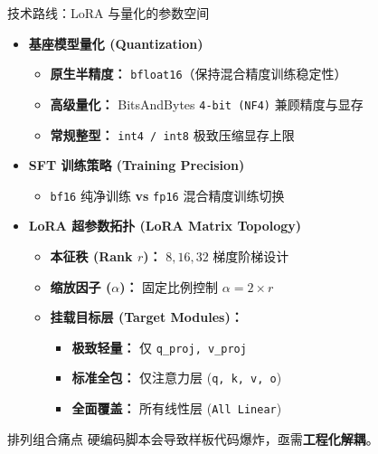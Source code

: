 \documentclass[aspectratio=169]{beamer}
\begin{document}
\begin{frame}{技术路线：LoRA 与量化的参数空间}
    \begin{itemize}
        \setlength{\itemsep}{0.6ex} %
        
        \item \textbf{基座模型量化 (Quantization)}
        \begin{itemize}
            \item[-] \textbf{原生半精度：} \texttt{bfloat16}（保持混合精度训练稳定性）
            \item[-] \textbf{高级量化：} BitsAndBytes \texttt{4-bit (NF4)} 兼顾精度与显存
            \item[-] \textbf{常规整型：} \texttt{int4 / int8} 极致压缩显存上限
        \end{itemize}
        
        \smallskip %
        
        \item \textbf{SFT 训练策略 (Training Precision)}
        \begin{itemize}
            \item[-] \texttt{bf16} 纯净训练 \textbf{vs} \texttt{fp16} 混合精度训练切换
        \end{itemize}
        
        \smallskip
        
        \item \textbf{LoRA 超参数拓扑 (LoRA Matrix Topology)}
        \begin{itemize}
            \item[-] \textbf{本征秩 (Rank $r$)：} $8, 16, 32$ 梯度阶梯设计
            \item[-] \textbf{缩放因子 ($\alpha$)：} 固定比例控制 $\alpha = 2 \times r$
            \item[-] \textbf{挂载目标层 (Target Modules)：}
            \begin{itemize}
                \item \textbf{极致轻量：} 仅 \texttt{q\_proj, v\_proj}
                \item \textbf{标准全包：} 仅注意力层 (\texttt{q, k, v, o})
                \item \textbf{全面覆盖：} 所有线性层 (\texttt{All Linear})
            \end{itemize}
        \end{itemize}
    \end{itemize}

    \vfill %

    \begin{alertblock}{排列组合痛点}
        硬编码脚本会导致样板代码爆炸，亟需\textbf{工程化解耦}。
    \end{alertblock}
\end{frame}
\end{document}
